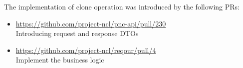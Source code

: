 \documentclass[../main.tex]{subfiles}
\begin{document}
The implementation of clone operation was introduced by the following PRs:

\begin{itemize}
    \item \url{https://github.com/project-ncl/pnc-api/pull/230}\\
    Introducing request and response DTOs

    \item \url{https://github.com/project-ncl/reqour/pull/4}\\
    Implement the business logic
\end{itemize}
\end{document}
